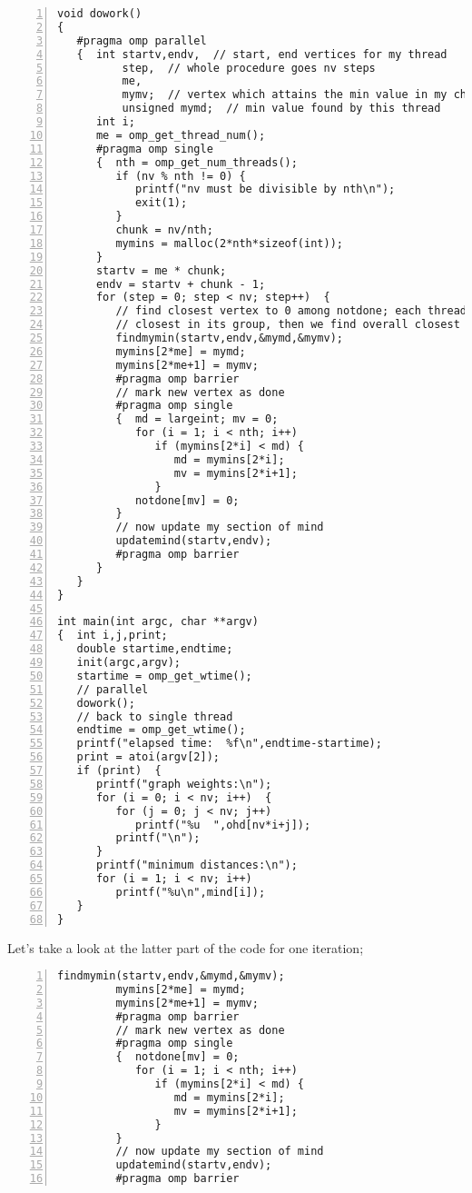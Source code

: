 \begin{Verbatim}[fontsize=\relsize{-2},numbers=left]
void dowork()
{
   #pragma omp parallel
   {  int startv,endv,  // start, end vertices for my thread
          step,  // whole procedure goes nv steps
          me,
          mymv;  // vertex which attains the min value in my chunk
          unsigned mymd;  // min value found by this thread
      int i;
      me = omp_get_thread_num();
      #pragma omp single
      {  nth = omp_get_num_threads();
         if (nv % nth != 0) {
            printf("nv must be divisible by nth\n");
            exit(1);
         }
         chunk = nv/nth;
         mymins = malloc(2*nth*sizeof(int));
      }
      startv = me * chunk;
      endv = startv + chunk - 1;
      for (step = 0; step < nv; step++)  {
         // find closest vertex to 0 among notdone; each thread finds
         // closest in its group, then we find overall closest
         findmymin(startv,endv,&mymd,&mymv);
         mymins[2*me] = mymd;
         mymins[2*me+1] = mymv;
         #pragma omp barrier
         // mark new vertex as done
         #pragma omp single
         {  md = largeint; mv = 0;
            for (i = 1; i < nth; i++)
               if (mymins[2*i] < md) {
                  md = mymins[2*i];
                  mv = mymins[2*i+1];
               }
            notdone[mv] = 0;
         }
         // now update my section of mind
         updatemind(startv,endv);
         #pragma omp barrier
      }
   }
}

int main(int argc, char **argv)
{  int i,j,print;
   double startime,endtime;
   init(argc,argv);
   startime = omp_get_wtime();
   // parallel
   dowork();
   // back to single thread
   endtime = omp_get_wtime();
   printf("elapsed time:  %f\n",endtime-startime);
   print = atoi(argv[2]);
   if (print)  {
      printf("graph weights:\n");
      for (i = 0; i < nv; i++)  {
         for (j = 0; j < nv; j++)
            printf("%u  ",ohd[nv*i+j]);
         printf("\n");
      }
      printf("minimum distances:\n");
      for (i = 1; i < nv; i++)
         printf("%u\n",mind[i]);
   }
}
\end{Verbatim}

Let's take a look at the latter part of the code for one iteration;

\begin{Verbatim}[fontsize=\relsize{-2},numbers=left]
         findmymin(startv,endv,&mymd,&mymv);
         mymins[2*me] = mymd;
         mymins[2*me+1] = mymv;
         #pragma omp barrier
         // mark new vertex as done
         #pragma omp single
         {  notdone[mv] = 0;
            for (i = 1; i < nth; i++)
               if (mymins[2*i] < md) {
                  md = mymins[2*i];
                  mv = mymins[2*i+1];
               }
         }
         // now update my section of mind
         updatemind(startv,endv);
         #pragma omp barrier
\end{Verbatim}

